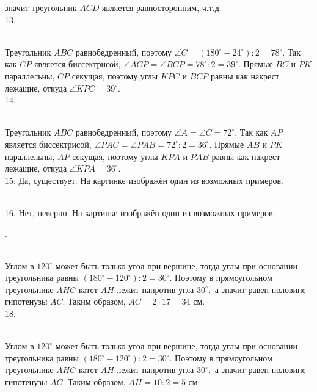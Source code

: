 значит треугольник $ACD$ является равносторонним, ч.т.д.\\
13. \begin{figure}[ht!]
\end{figure}\\
Треугольник $ABC$ равнобедренный, поэтому $\angle C=(180^\circ-24^\circ):2=78^\circ.$ Так как $CP$ является биссектрисой, $\angle ACP=\angle BCP=78^\circ:2=39^\circ.$ Прямые $BC$ и $PK$ параллельны, $CP$ секущая, поэтому углы $KPC$ и $BCP$ равны как накрест лежащие, откуда $\angle KPC=39^\circ.$\\
14. \begin{figure}[ht!]
\end{figure}\\
Треугольник $ABC$ равнобедренный, поэтому $\angle A=\angle C =72^\circ.$ Так как $AP$ является биссектрисой, $\angle PAC=\angle PAB=72^\circ:2=36^\circ.$ Прямые $AB$ и $PK$ параллельны, $AP$ секущая, поэтому углы $KPA$ и $PAB$ равны как накрест лежащие, откуда $\angle KPA=36^\circ.$\\
15. Да, существует. На картинке изображён один из возможных примеров.
\begin{figure}[ht!]
\end{figure}\\
16. Нет, неверно. На картинке изображён один из возможных примеров.
\begin{figure}[ht!]
\end{figure}\newpage{}. \begin{figure}[ht!]
\end{figure}\\
Углом в $120^\circ$ может быть только угол при вершине, тогда углы при основании треугольника равны $(180^\circ-120^\circ):2=30^\circ.$ Поэтому в прямоугольном треугольнике $AHC$ катет $AH$ лежит напротив угла $30^\circ,$ а значит равен половине гипотенузы $AC.$ Таким образом, $AC=2\cdot17=34$ см.\\
18. \begin{figure}[ht!]
\end{figure}\\
Углом в $120^\circ$ может быть только угол при вершине, тогда углы при основании треугольника равны $(180^\circ-120^\circ):2=30^\circ.$ Поэтому в прямоугольном треугольнике $AHC$ катет $AH$ лежит напротив угла $30^\circ,$ а значит равен половине гипотенузы $AC.$ Таким образом, $AH=10:2=5$ см.\\
